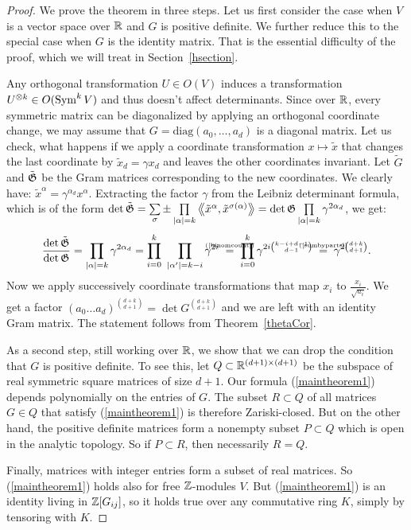 \begin{proof}
We prove the theorem in three steps.
Let us first consider the case when $V$ is a vector space over $\mathbb{R}$ and $G$ is positive definite. We further reduce this to the special case when $G$ is the identity matrix. That is the essential difficulty of the proof, which we will treat in Section~\ref{hsection}.

Any orthogonal transformation $U\in O(V)$ induces a transformation $U^{\otimes k} \in O(\operatorname{Sym}^k V)$ and thus doesn't affect determinants. Since over $\mathbb{R}$, every symmetric matrix can be diagonalized by applying an orthogonal coordinate change, we may assume that $G=\text{diag}\left(a_0,\ldots,a_d\right)$ is a diagonal matrix. 
Let us check, what happens if we apply a coordinate transformation $x\mapsto\tilde x$ that changes the last coordinate by $\tilde{x}_d = \gamma x_d$ and leaves the other coordinates invariant. Let $\tilde{G}$ and $\tilde{\mathfrak{G}}$ be the Gram matrices corresponding to the new coordinates.
We clearly have: $\tilde{x}^\alpha = \gamma^{\alpha_d} x^\alpha$. Extracting the factor $\gamma$ from the Leibniz determinant formula, which is of the form $\det \tilde{\mathfrak{G}}=\sum\limits_\sigma\pm\prod\limits_{|\alpha|=k} \left<\!\!\!\:\left< \tilde{x}^{\alpha},\tilde{x}^{\sigma(\alpha)}\right>\!\!\!\:\right>=\det \mathfrak{G}\prod\limits_{|\alpha|=k} \gamma^{2\alpha_d}$, we get: 
\vspace{-2mm}
$$
\frac{\det \tilde{\G}}{\det\G} = \prod_{|\alpha|=k}\gamma^{2\alpha_d} = \prod_{i=0}^k\ \prod_{|\alpha '|=k-i} \gamma^{2i} \; \myeq{(\ref{binomcount})}\;\prod_{i=0}^k\gamma^{2i\binom{k-i+d-1}{d-1}} \; \myeq{(\ref{sumbyparts})} \; \gamma^{2\binom{d+k}{d+1}}.
$$
Now we apply successively coordinate transformations that map $x_i$ to $\frac{x_i}{\sqrt{a_i}}$. We get a factor $(a_0\ldots a_d)^{\binom{d+k}{d+1}} = \det G^{\binom{d+k}{d+1}}$ and we are left with an identity Gram matrix. The statement follows from Theorem~\ref{thetaCor}.

As a second step, still working over $\mathbb{R}$, we show that we can drop the condition that $G$ is positive definite. To see this, let $Q\subset \mathbb{R}^{(d+1)\times(d+1)}$ be the subspace of real symmetric square matrices of size $d+1$. Our formula (\ref{maintheorem1}) depends polynomially on the entries of $G$. The subset $R\subset Q$ of all matrices $G\in Q$ that satisfy (\ref{maintheorem1}) is therefore Zariski-closed. But on the other hand, the positive definite matrices form a nonempty subset $P\subset Q$ which is open in the analytic topology. So if $P\subset R$, then necessarily $R=Q$.

Finally, matrices with integer entries form a subset of real matrices. So (\ref{maintheorem1}) holds also for free $\mathbb{Z}$-modules $V$. But (\ref{maintheorem1}) is an identity living in $\mathbb{Z}[G_{ij}]$, so it holds true over any commutative ring $K$, simply by tensoring with $K$.
\end{proof}




